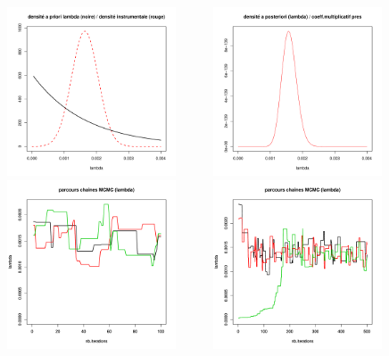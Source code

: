 \begin{rep}
\begin{center}
\includegraphics[width=6cm,height=5cm]{figures/calcul/prior-1.pdf} 
\includegraphics[width=6cm,height=5cm]{figures/calcul/posterior-1.pdf} \\
\includegraphics[width=6cm,height=5cm]{figures/calcul/MCMC1.pdf}
\includegraphics[width=6cm,height=5cm]{figures/calcul/MCMC2.pdf}
\end{center}
\end{rep}